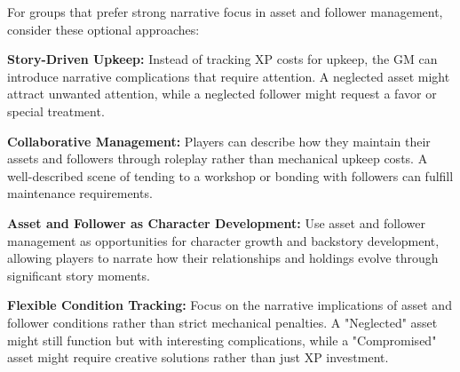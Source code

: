 For groups that prefer strong narrative focus in asset and follower management, consider these optional approaches:

\textbf{Story-Driven Upkeep:} Instead of tracking XP costs for upkeep, the GM can introduce narrative complications that require attention. A neglected asset might attract unwanted attention, while a neglected follower might request a favor or special treatment.

\textbf{Collaborative Management:} Players can describe how they maintain their assets and followers through roleplay rather than mechanical upkeep costs. A well-described scene of tending to a workshop or bonding with followers can fulfill maintenance requirements.

\textbf{Asset and Follower as Character Development:} Use asset and follower management as opportunities for character growth and backstory development, allowing players to narrate how their relationships and holdings evolve through significant story moments.

\textbf{Flexible Condition Tracking:} Focus on the narrative implications of asset and follower conditions rather than strict mechanical penalties. A "Neglected" asset might still function but with interesting complications, while a "Compromised" asset might require creative solutions rather than just XP investment.